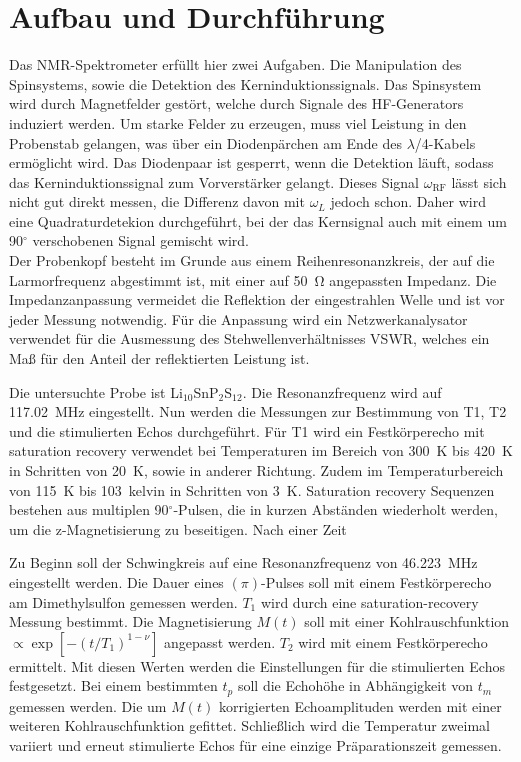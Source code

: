 \section{Aufbau und Durchführung}
Das NMR-Spektrometer erfüllt hier zwei Aufgaben. Die Manipulation des Spinsystems, sowie die Detektion des Kerninduktionssignals. Das Spinsystem wird durch
Magnetfelder gestört, welche durch Signale des HF-Generators induziert werden. Um starke Felder zu erzeugen, muss viel Leistung in den Probenstab gelangen,
was über ein Diodenpärchen am Ende des $\lambda$/4-Kabels ermöglicht wird. Das Diodenpaar ist gesperrt, wenn die Detektion läuft, sodass das Kerninduktionssignal
zum Vorverstärker gelangt. Dieses Signal $\omega_\text{RF}$ lässt sich nicht gut direkt messen, die Differenz davon mit $\omega_L$ jedoch schon. Daher wird
eine Quadraturdetekion durchgeführt, bei der das Kernsignal auch mit einem um 90$^\circ$ verschobenen Signal gemischt wird. 
\\ \noindent Der Probenkopf besteht im Grunde
aus einem Reihenresonanzkreis, der auf die Larmorfrequenz abgestimmt ist, mit einer auf \SI{50}{\ohm} angepassten Impedanz. Die Impedanzanpassung vermeidet die 
Reflektion der eingestrahlen Welle und ist vor jeder Messung notwendig. Für die Anpassung wird ein Netzwerkanalysator verwendet für die Ausmessung des
Stehwellenverhältnisses VSWR, welches ein Maß für den Anteil der reflektierten Leistung ist.

Die untersuchte Probe ist Li$_{10}$SnP$_2$S$_{12}$. Die Resonanzfrequenz wird auf \SI{117,02}{\mega\hertz} eingestellt. Nun werden die Messungen zur Bestimmung von T1, T2 
und die stimulierten Echos durchgeführt. Für T1 wird ein Festkörperecho mit saturation recovery verwendet bei Temperaturen im Bereich von \SI{300}{\kelvin} bis \SI{420}{\kelvin} 
in Schritten von \SI{20}{\kelvin}, sowie in anderer Richtung. Zudem im Temperaturbereich von \SI{115}{\kelvin} bis \SI{103}{kelvin} in Schritten von \SI{3}{\kelvin}. Saturation recovery Sequenzen bestehen
aus multiplen 90$^\circ$-Pulsen, die in kurzen Abständen wiederholt werden, um die z-Magnetisierung zu beseitigen. Nach einer Zeit 


\noindent Zu Beginn soll der Schwingkreis auf eine Resonanzfrequenz von \SI{46,223}{\mega\hertz} eingestellt werden. Die Dauer eines $(\pi)$-Pulses soll mit einem 
Festkörperecho am Dimethylsulfon gemessen werden. $T_1$ wird durch eine saturation-recovery Messung bestimmt. Die Magnetisierung $M(t)$ soll mit einer
Kohlrauschfunktion $\propto \exp[-(t/T_1)^{1-\nu}]$ angepasst werden. $T_2$ wird mit einem Festkörperecho ermittelt. Mit diesen Werten werden die Einstellungen
für die stimulierten Echos festgesetzt. Bei einem bestimmten $t_p$ soll die Echohöhe in Abhängigkeit von $t_m$ gemessen werden. Die um $M(t)$ korrigierten
Echoamplituden werden mit einer weiteren Kohlrauschfunktion gefittet. Schließlich wird die Temperatur zweimal variiert und erneut stimulierte Echos für eine einzige
Präparationszeit gemessen.

